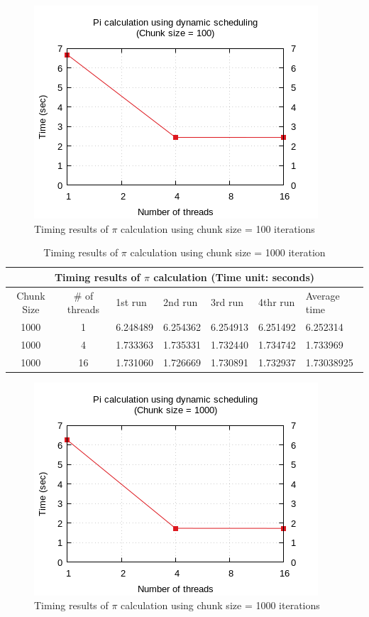 \documentclass{article}
\begin{document}
\begin{figure}[htbp]
  \centering
  \includegraphics[width=0.55\columnwidth]{../ex1/plots/pi_c100.png}
  \caption{Timing results of $\pi$ calculation using chunk size = 100 iterations}
\end{figure}


\begin{table}[htbp]
  \centering
    \begin{tabular}{|c c||l l l l| l|} 
    \hline
    \multicolumn{7}{|c|}{Timing results of $\pi$ calculation (Time unit: seconds)} \\
    \hline
    Chunk Size & \# of threads & 1st run & 2nd run & 3rd run & 4thr run & Average time\\ [0.5ex] 
    \hline\hline
    1000 & 1 & 6.248489 & 6.254362 & 6.254913 & 6.251492 & 6.252314 \\
    \hline
    1000 & 4 & 1.733363 & 1.735331 & 1.732440 & 1.734742 & 1.733969 \\
    \hline
    1000 & 16 & 1.731060 & 1.726669 & 1.730891 & 1.732937 & 1.73038925 \\ [1ex]
    \hline
    \end{tabular}
  \caption{Timing results of $\pi$ calculation using chunk size = 1000 iteration}
\end{table}

\begin{figure}[htbp]
  \centering
  \includegraphics[width=0.55\columnwidth]{../ex1/plots/pi_c1000.png}
  \caption{Timing results of $\pi$ calculation using chunk size = 1000 iterations}
\end{figure}
\end{document}
